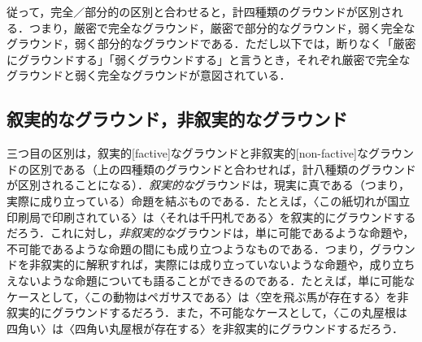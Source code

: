 \documentclass[twoside,14Q,dvipdfmx]{jsarticle}
\theoremstyle{definition}
\begin{document}
従って，完全／部分的の区別と合わせると，計四種類のグラウンドが区別される．つまり，厳密で完全なグラウンド，厳密で部分的なグラウンド，弱く完全なグラウンド，弱く部分的なグラウンドである．ただし以下では，断りなく「厳密にグラウンドする」「弱くグラウンドする」と言うとき，それぞれ厳密で完全なグラウンドと弱く完全なグラウンドが意図されている．

\subsection{叙実的なグラウンド，非叙実的なグラウンド}\label{factivenonfactive}
三つ目の区別は，叙実的[factive]なグラウンドと非叙実的[non-factive]なグラウンドの区別である（上の四種類のグラウンドと合わせれば，計八種類のグラウンドが区別されることになる）．\emph{叙実的な}グラウンドは，現実に真である（つまり，実際に成り立っている）命題を結ぶものである．たとえば，〈この紙切れが国立印刷局で印刷されている〉は〈それは千円札である〉を叙実的にグラウンドするだろう．これに対し，\emph{非叙実的な}グラウンドは，単に可能であるような命題や，不可能であるような命題の間にも成り立つようなものである．つまり，グラウンドを非叙実的に解釈すれば，実際には成り立っていないような命題や，成り立ちえないような命題についても語ることができるのである．たとえば，単に可能なケースとして，〈この動物はペガサスである〉は〈空を飛ぶ馬が存在する〉を非叙実的にグラウンドするだろう．また，不可能なケースとして，〈この丸屋根は四角い〉は〈四角い丸屋根が存在する〉を非叙実的にグラウンドするだろう．
\end{document}

